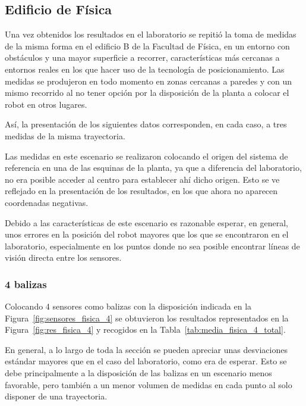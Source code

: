 \newpage
\subsection{Edificio de Física}

Una vez obtenidos los resultados en el laboratorio se repitió la toma de medidas de la misma forma en el edificio B de la Facultad de Física, en un entorno con obstáculos y una mayor superficie a recorrer, características más cercanas a entornos reales en los que hacer uso de la tecnología de posicionamiento.
Las medidas se produjeron en todo momento en zonas cercanas a paredes y con un mismo recorrido al no tener opción por la disposición de la planta a colocar el robot en otros lugares.

Así, la presentación de los siguientes datos corresponden, en cada caso, a tres medidas de la misma trayectoria.

Las medidas en este escenario se realizaron colocando el origen del sistema de referencia en una de las esquinas de la planta, ya que a diferencia del laboratorio, no era posible acceder al centro para establecer ahí dicho origen.
Esto se ve reflejado en la presentación de los resultados, en los que ahora no aparecen coordenadas negativas.

Debido a las características de este escenario es razonable esperar, en general, unos errores en la posición del robot mayores que los que se encontraron en el laboratorio, especialmente en los puntos donde no sea posible encontrar líneas de visión directa entre los sensores.

\subsubsection{4 balizas}

Colocando 4 sensores como balizas con la disposición indicada en la Figura~\ref{fig:sensores_fisica_4} se obtuvieron los resultados representados en la Figura~\ref{fig:res_fisica_4} y recogidos en la Tabla~\ref{tab:media_fisica_4_total}.

En general, a lo largo de toda la sección se pueden apreciar unas desviaciones estándar mayores que en el caso del laboratorio, como era de esperar.
Esto se debe principalmente a la disposición de las balizas en un escenario menos favorable, pero también a un menor volumen de medidas en cada punto al solo disponer de una trayectoria.


